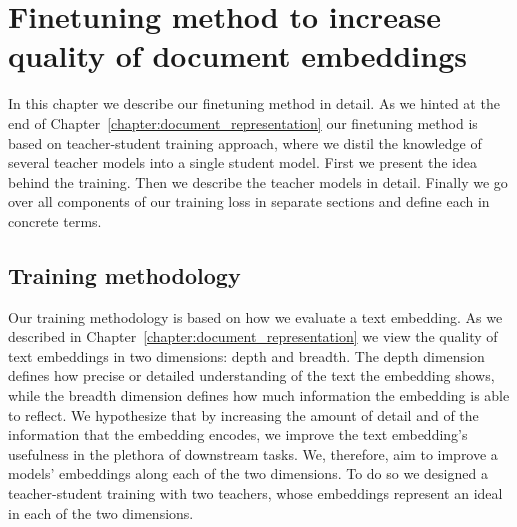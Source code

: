 \chapter{Finetuning method to increase quality of document embeddings}









In this chapter we describe our finetuning method in detail. As we hinted at the
end of Chapter~\ref{chapter:document_representation} our finetuning method is
based on teacher-student training approach, where we distil the knowledge of
several teacher models into a single student model. First we present the idea
behind the training. Then we describe the teacher models in detail. Finally we
go over all components of our training loss in separate sections and define each
in concrete terms.

\section{Training methodology}


Our training methodology is based on how we evaluate a text embedding. As we
described in Chapter~\ref{chapter:document_representation} we view the quality
of text embeddings in two dimensions: depth and breadth. The depth dimension
defines how precise or detailed understanding of the text the embedding shows,
while the breadth dimension defines how much information the embedding is able
to reflect. We hypothesize that by increasing the amount of detail and of the
information that the embedding encodes, we improve the text embedding's
usefulness in the plethora of downstream tasks. We, therefore, aim to improve a
models' embeddings along each of the two dimensions. To do so we designed a
teacher-student training with two teachers, whose embeddings represent an ideal
in each of the two dimensions.

